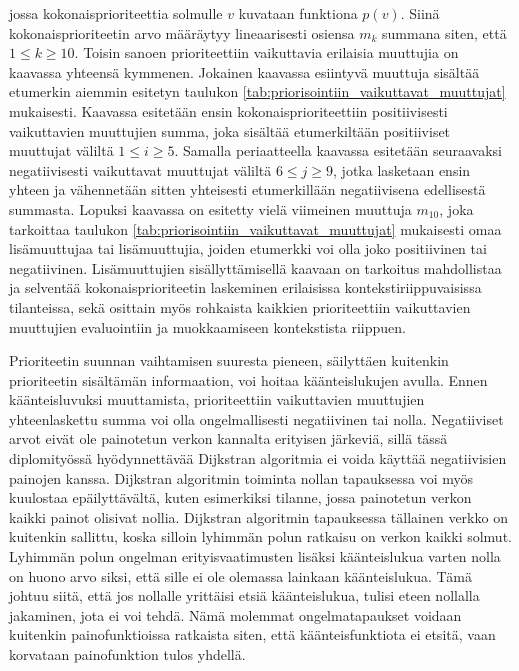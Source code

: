   jossa kokonaisprioriteettia solmulle \(v\) kuvataan funktiona \(p(v)\). Siinä kokonaisprioriteetin arvo määräytyy lineaarisesti osiensa \(m_k\) summana siten, että \(1 \leq k \geq 10\).
  Toisin sanoen prioriteettiin vaikuttavia erilaisia muuttujia on kaavassa yhteensä kymmenen.
  Jokainen kaavassa esiintyvä muuttuja sisältää etumerkin aiemmin esitetyn taulukon \ref{tab:priorisointiin_vaikuttavat_muuttujat} mukaisesti.
  Kaavassa esitetään ensin kokonaisprioriteettiin positiivisesti vaikuttavien muuttujien summa, joka sisältää etumerkiltään positiiviset muuttujat väliltä \(1 \leq i \geq 5\).
  Samalla periaatteella kaavassa esitetään seuraavaksi negatiivisesti vaikuttavat muuttujat väliltä \(6 \leq j \geq 9\), jotka lasketaan ensin yhteen ja vähennetään sitten yhteisesti etumerkillään negatiivisena edellisestä summasta.
  Lopuksi kaavassa on esitetty vielä viimeinen muuttuja \(m_{10}\), joka tarkoittaa taulukon \ref{tab:priorisointiin_vaikuttavat_muuttujat} mukaisesti omaa lisämuuttujaa tai lisämuuttujia, joiden etumerkki voi olla joko positiivinen tai negatiivinen.
  Lisämuuttujien sisällyttämisellä kaavaan on tarkoitus mahdollistaa ja selventää kokonaisprioriteetin laskeminen erilaisissa kontekstiriippuvaisissa tilanteissa, sekä osittain myös rohkaista kaikkien prioriteettiin vaikuttavien muuttujien evaluointiin ja muokkaamiseen kontekstista riippuen.

  Prioriteetin suunnan vaihtamisen suuresta pieneen, säilyttäen kuitenkin prioriteetin sisältämän informaation, voi hoitaa käänteislukujen avulla.
  Ennen käänteisluvuksi muuttamista, prioriteettiin vaikuttavien muuttujien yhteenlaskettu summa voi olla ongelmallisesti negatiivinen tai nolla.
  Negatiiviset arvot eivät ole painotetun verkon kannalta erityisen järkeviä, sillä tässä diplomityössä hyödynnettävää Dijkstran algoritmia ei voida käyttää negatiivisien painojen kanssa.
  Dijkstran algoritmin toiminta nollan tapauksessa voi myös kuulostaa epäilyttävältä, kuten esimerkiksi tilanne, jossa painotetun verkon kaikki painot olisivat nollia.
  Dijkstran algoritmin tapauksessa tällainen verkko on kuitenkin sallittu, koska silloin lyhimmän polun ratkaisu on verkon kaikki solmut.
  Lyhimmän polun ongelman erityisvaatimusten lisäksi käänteislukua varten nolla on huono arvo siksi, että sille ei ole olemassa lainkaan käänteislukua.
  Tämä johtuu siitä, että jos nollalle yrittäisi etsiä käänteislukua, tulisi eteen nollalla jakaminen, jota ei voi tehdä.
  Nämä molemmat ongelmatapaukset voidaan kuitenkin painofunktioissa ratkaista siten, että käänteisfunktiota ei etsitä, vaan korvataan painofunktion tulos yhdellä.

